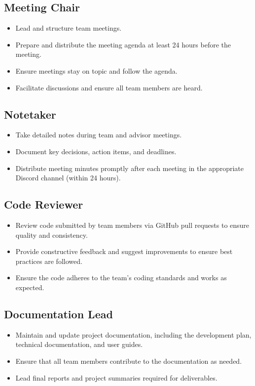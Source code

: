 \documentclass{article}
\begin{document}
\subsection{Meeting Chair} 
  \begin{itemize}
    \item Lead and structure team meetings.
    \item Prepare and distribute the meeting agenda at least 24 hours before the meeting.
    \item Ensure meetings stay on topic and follow the agenda.
    \item Facilitate discussions and ensure all team members are heard.
  \end{itemize}

\subsection{Notetaker}
  \begin{itemize}
    \item Take detailed notes during team and advisor meetings.
    \item Document key decisions, action items, and deadlines.
    \item Distribute meeting minutes promptly after each meeting in the appropriate Discord channel (within 24 hours).
  \end{itemize}

\subsection{Code Reviewer}
  \begin{itemize}
    \item Review code submitted by team members via GitHub pull requests to ensure quality and consistency.
    \item Provide constructive feedback and suggest improvements to ensure best practices are followed.
    \item Ensure the code adheres to the team's coding standards and works as expected.
  \end{itemize}

\subsection{Documentation Lead}
  \begin{itemize}
    \item Maintain and update project documentation, including the development plan, technical documentation, and user guides.
    \item Ensure that all team members contribute to the documentation as needed.
    \item Lead final reports and project summaries required for deliverables.
  \end{itemize}
\end{document}
